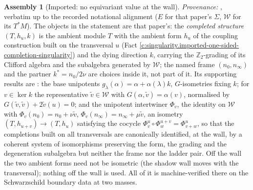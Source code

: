 \documentclass[11pt]{article}
\theoremstyle{definition}
\newtheorem{assembled}[theorem]{Assembly}
\theoremstyle{plain}
\providecommand{\nInf}{}\renewcommand{\nInf}{n_\infty}
\providecommand{\nO}{}\renewcommand{\nO}{n_0}
\providecommand{\shW}{}\renewcommand{\shW}{\mathcal{W}}
\begin{document}
\begin{assembled}[Imported: no equivariant value at the wall]
\emph{Provenance:} \cite[Thm.~10.4]{ButlerT4}, verbatim up to the recorded notational alignment ($E$ for that paper's $\Sigma$, $\shW$ for its $T^*M$). The objects in the statement are that paper's: the \emph{completed structure} $(T, h_u, k)$ is the ambient module $T$ with the ambient form $h_u$ of the coupling construction built on the transversal $u$ (Fact \ref{c:singularity.imported-one-sided-completion-singularity}) and the dying direction $k$, carrying the $\mathbb{Z}_2$-grading of its Clifford algebra and the subalgebra generated by $\shW$; the named frame $(\nO, \nInf)$ and the partner $k^* = \nO/2\nu$ are choices inside it, not part of it. Its supporting results are \cite[Lems 10.1, 10.2, Thm.~10.3]{ButlerT4}: the base unipotents $g_\lambda(\alpha) = \alpha + \alpha(\lambda)k$, $G$-isometries fixing $k$; for $v \in \ker k$ the representative $\tilde v \in \shW$ with $G(\alpha, \tilde v) = \alpha(v)$, normalised by $G(\tilde v, \tilde v) + 2\tilde v(u) = 0$; and the unipotent intertwiner $\Phi_v$, the identity on $\shW$ with $\Phi_v(\nO) = \nO + \nu\tilde v$, $\Phi_v(\nInf) = \nInf + \mu\tilde v$, an isometry $(T, h_{u+v}) \to (T, h_u)$ satisfying the cocycle $\Phi^u_v \circ \Phi^{u+v}_w = \Phi^u_{v+w}$, so that the completions built on all transversals are canonically identified, at the wall, by a coherent system of isomorphisms preserving the form, the grading and the degeneration subalgebra but neither the frame nor the ladder pair. Off the wall the two ambient forms need not be isometric (the shadow wall moves with the transversal); nothing off the wall is used. All of it is machine-verified there on the Schwarzschild boundary data at two masses.
\end{assembled}
\end{document}
